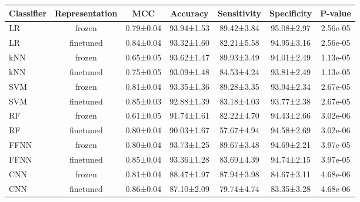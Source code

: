 \begin{tabular}{lcccccc}
\toprule
Classifier & Representation &       MCC &   Accuracy & Sensitivity & Specificity &  P-value \\
\midrule
        LR &         frozen & 0.79±0.04 & 93.94±1.53 &  89.42±3.84 &  95.08±2.97 & 2.56e-05 \\
        LR &      finetuned & 0.84±0.04 & 93.32±1.60 &  82.21±5.58 &  94.95±3.16 & 2.56e-05 \\
       kNN &         frozen & 0.65±0.05 & 93.62±1.47 &  89.93±3.49 &  94.01±2.49 & 1.13e-05 \\
       kNN &      finetuned & 0.75±0.05 & 93.09±1.48 &  84.53±4.24 &  93.81±2.49 & 1.13e-05 \\
       SVM &         frozen & 0.81±0.04 & 93.35±1.36 &  89.28±3.35 &  93.94±2.34 & 2.67e-05 \\
       SVM &      finetuned & 0.85±0.03 & 92.88±1.39 &  83.18±4.03 &  93.77±2.38 & 2.67e-05 \\
        RF &         frozen & 0.61±0.05 & 91.74±1.61 &  82.22±4.70 &  94.43±2.66 & 3.02e-06 \\
        RF &      finetuned & 0.80±0.04 & 90.03±1.67 &  57.67±4.94 &  94.58±2.69 & 3.02e-06 \\
      FFNN &         frozen & 0.80±0.04 & 93.73±1.25 &  89.67±3.48 &  94.69±2.21 & 3.97e-05 \\
      FFNN &      finetuned & 0.85±0.04 & 93.36±1.28 &  83.69±4.39 &  94.74±2.15 & 3.97e-05 \\
       CNN &         frozen & 0.81±0.04 & 88.47±1.97 &  87.94±3.98 &  84.67±3.11 & 4.68e-06 \\
       CNN &      finetuned & 0.86±0.04 & 87.10±2.09 &  79.74±4.74 &  83.35±3.28 & 4.68e-06 \\
\bottomrule
\end{tabular}
